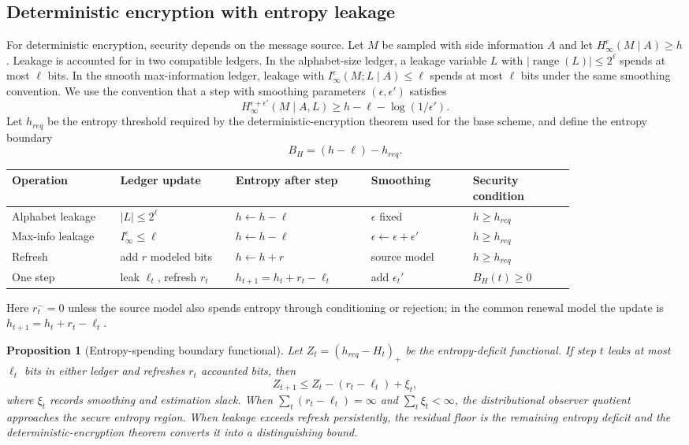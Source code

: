 \documentclass[11pt]{article}
\theoremstyle{definition}
\theoremstyle{plain}
\newtheorem{proposition}[definition]{Proposition}
\theoremstyle{remark}
\begin{document}
\subsection{Deterministic encryption with entropy leakage}

For deterministic encryption, security depends on the message source. Let $M$ be sampled with side information $A$ and let $H_\infty^\epsilon(M\mid A)\ge h$. Leakage is accounted for in two compatible ledgers. In the alphabet-size ledger, a leakage variable $L$ with $|\operatorname{range}(L)|\le2^\ell$ spends at most $\ell$ bits. In the smooth max-information ledger, leakage with $I_\infty^\epsilon(M;L\mid A)\le\ell$ spends at most $\ell$ bits under the same smoothing convention. We use the convention that a step with smoothing parameters $(\epsilon,\epsilon')$ satisfies
\[
H_\infty^{\epsilon+\epsilon'}(M\mid A,L)\ge h-\ell-\log(1/\epsilon').
\]
Let $h_{req}$ be the entropy threshold required by the deterministic-encryption theorem used for the base scheme, and define the entropy boundary
\[
    B_H=(h-\ell)-h_{req}.
\]

\begin{center}
\scriptsize
\setlength{\tabcolsep}{3pt}
\begin{tabular}{@{}p{0.16\linewidth}p{0.17\linewidth}p{0.20\linewidth}p{0.15\linewidth}p{0.15\linewidth}@{}}
\toprule
Operation & Ledger update & Entropy after step & Smoothing & Security condition\\
\midrule
Alphabet leakage & $|L|\le2^\ell$ & $h\leftarrow h-\ell$ & $\epsilon$ fixed & $h\ge h_{req}$\\
Max-info leakage & $I_\infty^\epsilon\le\ell$ & $h\leftarrow h-\ell$ & $\epsilon\leftarrow\epsilon+\epsilon'$ & $h\ge h_{req}$\\
Refresh & add $r$ modeled bits & $h\leftarrow h+r$ & source model & $h\ge h_{req}$\\
One step & leak $\ell_t$, refresh $r_t$ & $h_{t+1}=h_t+r_t-\ell_t$ & add $\epsilon_t'$ & $B_H(t)\ge0$\\
\bottomrule
\end{tabular}
\end{center}
Here $r_t^{-}=0$ unless the source model also spends entropy through conditioning or rejection; in the common renewal model the update is $h_{t+1}=h_t+r_t-\ell_t$.

\begin{proposition}[Entropy-spending boundary functional]
Let $Z_t=(h_{req}-H_t)_+$ be the entropy-deficit functional. If step $t$ leaks at most $\ell_t$ bits in either ledger and refreshes $r_t$ accounted bits, then
\[
Z_{t+1}\le Z_t-(r_t-\ell_t)+\xi_t,
\]
where $\xi_t$ records smoothing and estimation slack. When $\sum_t(r_t-\ell_t)=\infty$ and $\sum_t\xi_t<\infty$, the distributional observer quotient approaches the secure entropy region. When leakage exceeds refresh persistently, the residual floor is the remaining entropy deficit and the deterministic-encryption theorem converts it into a distinguishing bound.
\end{proposition}
\end{document}
